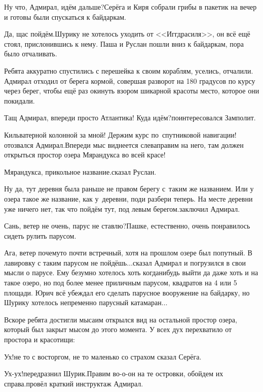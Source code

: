 \diagdash Ну что, Адмирал, идём дальше?\mdash Серёга и Киря собрали грибы в пакетик на вечер и готовы были спускаться к байдаркам.

\diagdash Да, щас пойдём.\mdash Шурику не хотелось уходить от <<Иггдрасиля>>, он всё ещё стоял, прислонившись к нему. Паша и Руслан пошли вниз к байдаркам, пора было отчаливать.

Ребята аккуратно спустились с перешейка к своим кораблям, уселись, отчалили. Адмирал отходил от берега кормой, совершая разворот на 180 градусов по курсу через берег, чтобы ещё раз окинуть взором шикарной красоты место, которое они покидали. 

\diagdash Тащ Адмирал, впереди просто Атлантика! Куда идём?\mdash поинтересовался Замполит.

\diagdash Кильватерной колонной за мной! Держим курс по~спутниковой навигации!\mdash отозвался Адмирал.\mdash Впереди мыс виднеется слева\mdash правим на него, там должен открыться простор озера Мярандукса во всей красе!

\diagdash Мярандукса, прикольное название.\mdash сказал Руслан.

\diagdash Ну да, тут деревня была раньше не правом берегу с~таким же названием. Или у озера такое же название, как у~деревни, поди разбери теперь. На месте деревни уже ничего нет, так что пойдём тут, под левым берегом.\mdash заключил Адмирал.

\diagdash Сань, ветер не очень, парус не ставлю?\mdash Пашке, естественно, очень понравилось сидеть рулить парусом.

\diagdash Ага, ветер почему\sdash то почти встречный, хотя на прошлом озере был попутный. В лавировку с таким парусом не пойдёшь$\ldots$\mdash сказал Адмирал и погрузился в свои мысли о парусе. Ему безумно хотелось хоть когда\sdash нибудь выйти да даже хоть и на такое озеро, но под более менее приличным парусом, квадратов на 4 или 5 площади. Юрич всё убеждал его сделать парусное вооружение на байдарку, но Шурику хотелось непременно парусный катамаран$\ldots$

Вскоре ребята достигли мыса\mdash им открылся вид на остальной простор озера, который был закрыт мысом до этого момента. У всех дух перехватило от простора и красотищи:

\diagdash Ух!\mdash не то с восторгом, не то маленько со страхом сказал Серёга.

\diagdash Ух-ух!\mdash передразнил Шурик.\mdash Правим во-о-он на те островки, обойдем их справа.\mdash провёл краткий инструктаж Адмирал.

